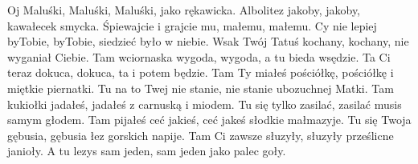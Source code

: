 \beginverse
Oj Maluśki, Maluśki, Maluśki, jako rękawicka.
Albolitez jakoby, jakoby, kawałecek smycka.
\endverse
\beginchorus
Śpiewajcie i grajcie mu,
małemu, małemu.
\endchorus
\beginverse
Cy nie lepiej byTobie, byTobie, siedzieć było w niebie.
Wsak Twój Tatuś kochany, kochany, nie wyganiał Ciebie.
\endverse
\beginverse
Tam wciornaska wygoda, wygoda, a tu bieda wsędzie.
Ta Ci teraz dokuca, dokuca, ta i potem będzie.
\endverse
\beginverse
Tam Ty miałeś pościółkę, pościółkę i miętkie piernatki.
Tu na to Twej nie stanie, nie stanie ubozuchnej Matki.
\endverse
\beginverse
Tam kukiołki jadałeś, jadałeś z carnuską i miodem.
Tu się tylko zasilać, zasilać musis samym głodem.
\endverse
\beginverse
Tam pijałeś ceć jakieś, ceć jakeś słodkie małmazyje.
Tu się Twoja gębusia, gębusia łez gorskich napije.
\endverse
\beginverse
Tam Ci zawsze słuzyły, słuzyły prześlicne janioły.
A tu lezys sam jeden, sam jeden jako palec goły.
\endverse
\endsong